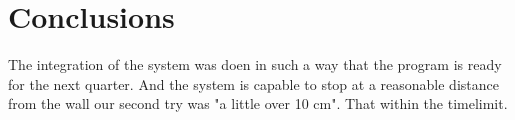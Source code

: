 \documentclass[final]{scrreprt} %
\begin{document}
\chapter{Conclusions}

The integration of the system was doen in such a way that the program is ready for the next quarter.
And the system is capable to stop at a reasonable distance from the wall our second try was "a little over 10 cm".
That within the timelimit.
\end{document}
